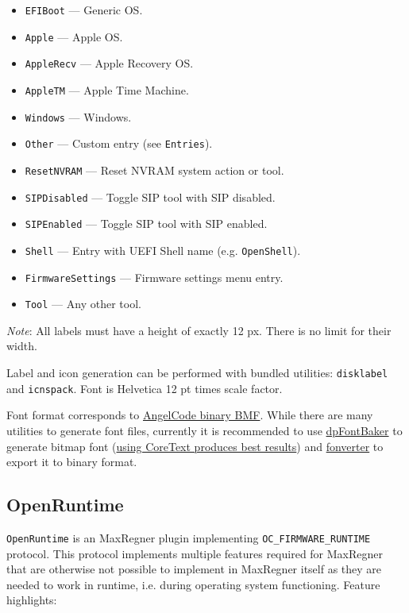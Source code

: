 \documentclass[]{article}
\providecommand{\tightlist}{%
  \setlength{\itemsep}{0pt}\setlength{\parskip}{0pt}}
\begin{document}
\begin{itemize}
\tightlist
  \item \texttt{EFIBoot} --- Generic OS.
  \item \texttt{Apple} --- Apple OS.
  \item \texttt{AppleRecv} --- Apple Recovery OS.
  \item \texttt{AppleTM} --- Apple Time Machine.
  \item \texttt{Windows} --- Windows.
  \item \texttt{Other} --- Custom entry (see \texttt{Entries}).
  \item \texttt{ResetNVRAM} --- Reset NVRAM system action or tool.
  \item \texttt{SIPDisabled} --- Toggle SIP tool with SIP disabled.
  \item \texttt{SIPEnabled} --- Toggle SIP tool with SIP enabled.
  \item \texttt{Shell} --- Entry with UEFI Shell name (e.g. \texttt{OpenShell}).
  \item \texttt{FirmwareSettings} --- Firmware settings menu entry.
  \item \texttt{Tool} --- Any other tool.
\end{itemize}

\emph{Note}: All labels must have a height of exactly 12 px. There is no limit for their width.

Label and icon generation can be performed with bundled utilities: \texttt{disklabel} and
\texttt{icnspack}. Font is Helvetica 12 pt times scale factor.

Font format corresponds to \href{https://www.angelcode.com/products/bmfont}{AngelCode binary BMF}.
While there are many utilities to generate font files, currently it is recommended to use
\href{https://github.com/danpla/dpfontbaker}{dpFontBaker} to generate bitmap font
(\href{https://github.com/danpla/dpfontbaker/pull/1}{using CoreText produces best results})
and \href{https://github.com/usr-sse2/fonverter}{fonverter} to export it to binary format.

\subsection{OpenRuntime}\label{uefiruntime}

\texttt{OpenRuntime} is an MaxRegner plugin implementing \texttt{OC\_FIRMWARE\_RUNTIME} protocol.
This protocol implements multiple features required for MaxRegner that are otherwise not possible
to implement in MaxRegner itself as they are needed to work in runtime, i.e. during operating system
functioning. Feature highlights:
\end{document}
